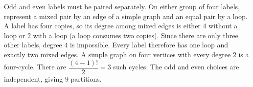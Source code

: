 Odd and even labels must be paired separately. On either group of four labels, represent a mixed pair by an edge of a simple graph and an equal pair by a loop. A label has four copies, so its degree among mixed edges is either $4$ without a loop or $2$ with a loop (a loop consumes two copies). Since there are only three other labels, degree $4$ is impossible. Every label therefore has one loop and exactly two mixed edges. A simple graph on four vertices with every degree $2$ is a four-cycle. There are $\dfrac{(4-1)!}{2}=3$ such cycles. The odd and even choices are independent, giving $\boxed9$ partitions.
